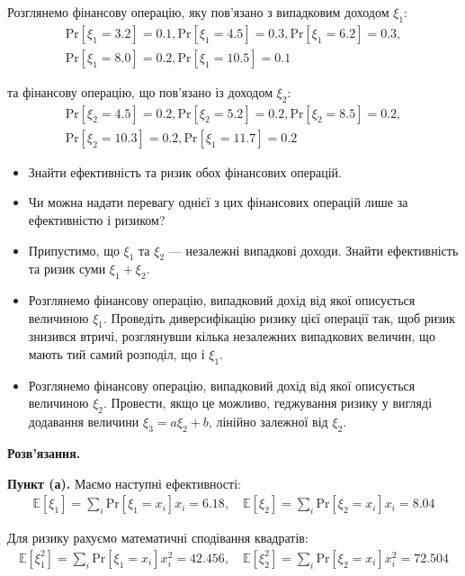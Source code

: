 \documentclass{hw_template}
\begin{document}
\begin{problem}
    Розглянемо фінансову операцію, яку пов'язано з випадковим доходом $\xi_1$:
    \begin{gather*}
        \text{Pr}[\xi_1=3.2] = 0.1, \text{Pr}[\xi_1=4.5] = 0.3, \text{Pr}[\xi_1=6.2] = 0.3, \\ \text{Pr}[\xi_1=8.0] = 0.2, \text{Pr}[\xi_1=10.5] = 0.1
    \end{gather*}

    та фінансову операцію, що пов'язано із доходом $\xi_2$:
    \begin{gather*}
        \text{Pr}[\xi_2=4.5] = 0.2, \text{Pr}[\xi_2=5.2] = 0.2, \text{Pr}[\xi_2=8.5] = 0.2, \\ \text{Pr}[\xi_2=10.3] = 0.2, \text{Pr}[\xi_1=11.7] = 0.2
    \end{gather*}

    \begin{itemize}
        \item Знайти ефективність та ризик обох фінансових операцій.
        \item Чи можна надати перевагу однієї з цих фінансових операцій лише за
        ефективністю і ризиком?
        \item Припустимо, що $\xi_1$ та $\xi_2$ --- незалежні випадкові доходи. Знайти
        ефективність та ризик суми $\xi_1 + \xi_2$.
        \item Розглянемо фінансову операцію, випадковий дохід від якої
        описується величиною $\xi_1$. Проведіть диверсифікацію ризику цієї
        операції так, щоб ризик знизився втричі, розглянувши кілька незалежних
        випадкових величин, що мають тий самий розподіл, що і $\xi_1$.
        \item Розглянемо фінансову операцію, випадковий дохід від якої
        описується величиною $\xi_2$. Провести, якщо це можливо, геджування
        ризику у вигляді додавання величини $\xi_3=a\xi_2+b$, лінійно залежної
        від $\xi_2$.
    \end{itemize}
\end{problem}

\textbf{Розв'язання.}

\textbf{Пункт (а).} Маємо наступні ефективності:
\begin{gather*}
    \mathbb{E}[\xi_1] = \sum_i \text{Pr}[\xi_1=x_i]x_i = 6.18, \quad \mathbb{E}[\xi_2] = \sum_i \text{Pr}[\xi_2=x_i]x_i = 8.04
\end{gather*}

Для ризику рахуємо математичні сподівання квадратів:
\begin{gather*}
    \mathbb{E}[\xi_1^2] = \sum_i \text{Pr}[\xi_1=x_i]x_i^2 = 42.456, \quad \mathbb{E}[\xi_2^2] = \sum_i \text{Pr}[\xi_2=x_i]x_i^2 = 72.504
\end{gather*}
\end{document}
